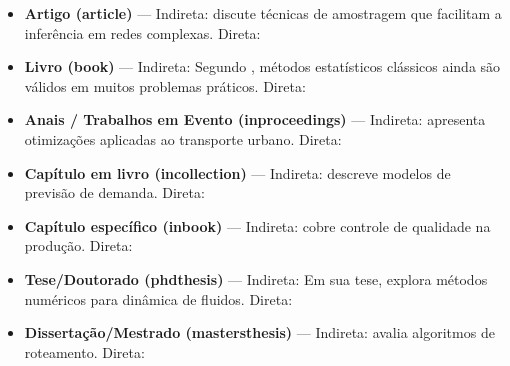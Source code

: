 \begin{itemize}
    \item \textbf{Artigo (article)} --- Indireta: \textcite{article1} discute técnicas de amostragem que facilitam a inferência em redes complexas. Direta:\par

    \item \textbf{Livro (book)} --- Indireta: Segundo \textcite{book1}, métodos estatísticos clássicos ainda são válidos em muitos problemas práticos. Direta:\par

    \item \textbf{Anais / Trabalhos em Evento (inproceedings)} --- Indireta: \textcite{inproceedings1} apresenta otimizações aplicadas ao transporte urbano. Direta:\par

    \item \textbf{Capítulo em livro (incollection)} --- Indireta: \textcite{incollection1} descreve modelos de previsão de demanda. Direta:\par

    \item \textbf{Capítulo específico (inbook)} --- Indireta: \textcite{inbook1} cobre controle de qualidade na produção. Direta:\par

    \item \textbf{Tese/Doutorado (phdthesis)} --- Indireta: Em sua tese, \textcite{phdthesis1} explora métodos numéricos para dinâmica de fluidos. Direta:\par

    \item \textbf{Dissertação/Mestrado (mastersthesis)} --- Indireta: \textcite{mastersthesis1} avalia algoritmos de roteamento. Direta:\par


\end{itemize}
